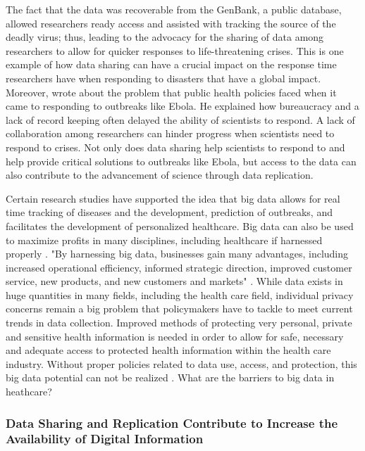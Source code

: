 \documentclass[sigconf]{acmart}
\begin{document}
The fact that the data was recoverable from the GenBank, a public database, allowed researchers ready access and assisted with tracking the source of the deadly virus; thus, leading to the advocacy for the sharing of data among researchers to allow for quicker responses to life-threatening crises. This is one example of how data sharing can have a crucial impact on the response time researchers have when responding to disasters that have a global impact. Moreover, \cite{vogel2014delays} wrote about the problem that public health policies faced when it came to responding to outbreaks like Ebola. He explained how bureaucracy and a lack of record keeping often delayed the ability of scientists to respond. A lack of collaboration among researchers can hinder progress when scientists need to respond to crises. Not only does data sharing help scientists to respond to and help provide critical solutions to outbreaks like Ebola, but access to the data can also contribute to the advancement of science through data replication. 

Certain research studies have supported the idea that big data allows for real time tracking of diseases and the development, prediction of outbreaks, and facilitates the development of personalized healthcare. Big data can also be used to maximize profits in many disciplines, including healthcare if harnessed properly \cite{van2011health}. "By harnessing big data, businesses gain many advantages, including increased operational efficiency, informed strategic direction, improved customer service, new products, and new customers and markets" \cite{khan2014big}. While data exists in huge quantities in many fields, including the health care field, individual privacy concerns remain a big problem that policymakers have to tackle to meet current trends in data collection. Improved methods of protecting very personal, private and sensitive health information is needed in order to allow for safe, necessary and adequate access to protected health information within the health care industry. Without proper policies related to data use, access, and protection, this big data potential can not be realized \cite{roski2014creating}. What are the barriers to big data in heathcare? 

\subsubsection {Data Sharing and Replication Contribute to Increase the Availability of Digital Information}
\end{document}

